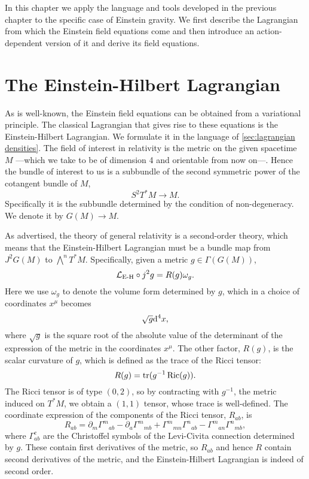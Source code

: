 \documentclass[../main.tex]{subfiles}
\begin{document}
In this chapter we apply the language and tools developed in the previous chapter to the
specific case of Einstein gravity. We first describe the Lagrangian from which the Einstein
field equations come and then introduce an action-dependent version of it and
derive its field equations. 

\section{The Einstein-Hilbert Lagrangian}
As is well-known, the Einstein field equations can be obtained from a variational
principle. The classical Lagrangian that gives rise to these equations is the Einstein-Hilbert
Lagrangian. We formulate it in the language of \cref{sec:lagrangian densities}. The field of interest in relativity is the metric on the given spacetime \(M\) ---which we take to be of dimension 4 and orientable from now on---. Hence the bundle of interest to us is a subbundle of the second symmetric power of the cotangent bundle of \( M\), 
\begin{equation}
    S^2 T^\ast M \to M.
\end{equation}
Specifically it is the subbundle determined by the condition of non-degeneracy. We denote it by \( G(M) \to M \).  

As advertised, the theory of general relativity is a second-order theory, which means that the Einstein-Hilbert Lagrangian must be a bundle map from \( J^2 G(M)\) to \(\bigwedge^n T^\ast M \). Specifically, given a metric \( g \in \Gamma(G(M)) \),
\begin{equation} \label{eq:EH lagrangian}
     \mathcal{L}_\text{E-H} \circ j^2 g = R(g) \omega_g.
\end{equation}
Here we use \( \omega_ g \) to denote the volume form determined by \(g\), which in a choice of coordinates  \(x^\mu\) becomes
\begin{equation}
    \sqrt{g} \mathrm{d}^4 x,
\end{equation}
where \( \sqrt{g} \) is the square root of the absolute value of the determinant of the expression of the metric in the coordinates \(x^\mu\). 
The other factor, \(R(g)\), is the scalar curvature of \(g\), which is defined as the trace of the Ricci tensor:
\begin{equation}
    R(g) = \operatorname{tr}(g^{-1} \operatorname{Ric}(g)).
\end{equation}
The Ricci tensor is of type \((0,2) \), so by contracting with \(g^{-1}\), the metric induced on \(T^\ast M\), we obtain a \((1,1)\) tensor, whose trace is well-defined. The coordinate expression of the components of the Ricci tensor, \(R_{ab}\), is
\begin{equation} \label{eq:ricci tensor}
	R_{ab} = \partial_m{\Gamma^m}_{ab} - \partial_a {\Gamma^m}_{mb} + {\Gamma^m}_{mn}
	{\Gamma^n}_{ab} - {\Gamma^m}_{an}{\Gamma^n}_{mb},
\end{equation}
where \( \Gamma_{ab}^c \) are the Christoffel symbols of the Levi-Civita connection determined by \(g\). These contain first derivatives of the metric, so \( R_{ab} \) and
hence \( R \) contain second derivatives of the metric, and the Einstein-Hilbert Lagrangian is indeed of second order.
\end{document}

